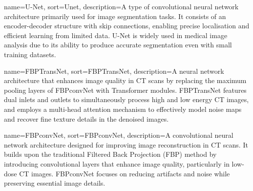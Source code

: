 {
    name={U-Net},
    sort=Unet,
    description={A type of convolutional neural network architecture primarily used for image segmentation tasks. It consists of an encoder-decoder structure with skip connections, enabling precise localisation and efficient learning from limited data. U-Net is widely used in medical image analysis due to its ability to produce accurate segmentation even with small training datasets.}
}

{
    name={FBPTransNet},
    sort=FBPTransNet,
    description={A neural network architecture that enhances image quality in CT scans by replacing the maximum pooling layers of FBPconvNet with Transformer modules. FBPTransNet features dual inlets and outlets to simultaneously process high and low energy CT images, and employs a multi-head attention mechanism to effectively model noise maps and recover fine texture details in the denoised images.}
}

{
    name={FBPconvNet},
    sort=FBPconvNet,
    description={A convolutional neural network architecture designed for improving image reconstruction in CT scans. It builds upon the traditional Filtered Back Projection (FBP) method by introducing convolutional layers that enhance image quality, particularly in low-dose CT images. FBPconvNet focuses on reducing artifacts and noise while preserving essential image details.}
}




